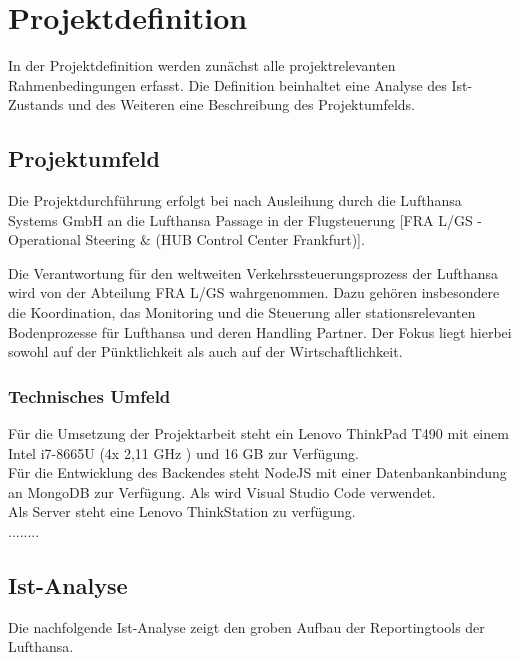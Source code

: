 \section{Projektdefinition}
	In der Projektdefinition werden zunächst alle projektrelevanten Rahmenbedingungen erfasst.
	Die Definition beinhaltet eine Analyse des Ist-Zustands und des Weiteren eine Beschreibung
	des Projektumfelds.

	\subsection{Projektumfeld}

		
		
		Die Projektdurchführung erfolgt bei nach Ausleihung durch die Lufthansa Systems GmbH an die Lufthansa Passage in der Flugsteuerung [FRA L/GS - Operational Steering \&  (HUB Control Center Frankfurt)].

		Die Verantwortung für den weltweiten Verkehrssteuerungsprozess der Lufthansa wird von der
		Abteilung FRA L/GS wahrgenommen. Dazu gehören insbesondere die Koordination, das
		Monitoring und die Steuerung aller stationsrelevanten Bodenprozesse für Lufthansa und deren
		Handling Partner. Der Fokus liegt hierbei sowohl auf der Pünktlichkeit als auch auf der
		Wirtschaftlichkeit.

		\subsubsection{Technisches Umfeld}
		
		Für die Umsetzung der Projektarbeit steht ein Lenovo ThinkPad T490 mit einem Intel i7-8665U (4x 2,11 GHz ) und 16 GB   zur Verfügung.\\
		Für die Entwicklung des Backendes steht NodeJS mit einer Datenbankanbindung an MongoDB zur Verfügung. Als  wird Visual Studio Code verwendet.
		\\
		
		Als Server steht eine Lenovo ThinkStation zu verfügung.\\
	........

		\subsection{Ist-Analyse}
		Die nachfolgende Ist-Analyse zeigt den groben Aufbau der Reportingtools der Lufthansa.\\

